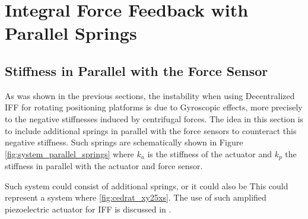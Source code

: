 \documentclass{ISMA_USD2020}
\begin{document}
\section{Integral Force Feedback with Parallel Springs}
\label{sec:orgfb6b0e8}
\label{sec:iff_kp}
\subsection{Stiffness in Parallel with the Force Sensor}
\label{sec:org4af80eb}

As was shown in the previous sections, the instability when using Decentralized IFF for rotating positioning platforms is due to Gyroscopic effects, more precisely to the negative stiffnesses induced by centrifugal forces.
The idea in this section is to include additional springs in parallel with the force sensors to counteract this negative stiffness.
Such springs are schematically shown in Figure \ref{fig:system_parallel_springs} where \(k_a\) is the stiffness of the actuator and \(k_p\) the stiffness in parallel with the actuator and force sensor.

Such system could consist of additional springs, or it could also be
This could represent a system where \ref{fig:cedrat_xy25xs}.
The use of such amplified piezoelectric actuator for IFF is discussed in  \cite{souleille18_concep_activ_mount_space_applic}.
\end{document}
